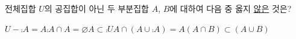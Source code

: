 전체집합 $U$의 공집합이 아닌 두 부분집합 $A$, $B$에 대하여 다음 중 옳지 \underline{않은} 것은?
\begin{choicesii}{$U-\comp{A}=A$}{$\comp{A}\cap A=\varnothing$}{$A\subset\comp{U}$}{$A\cap(A\cup\comp{A})=A$}{$(A\cap B)\subset(A\cup B)$}\end{choicesii}
